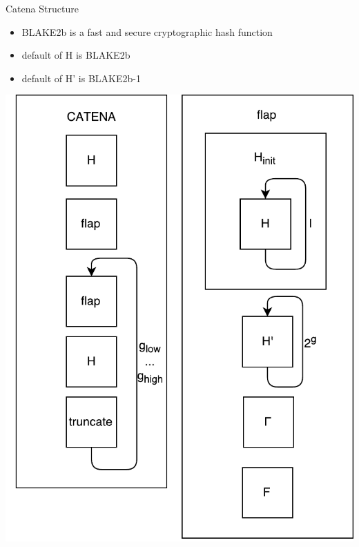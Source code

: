 \documentclass[11pt,aspectratio=169]{beamer}
\begin{document}
\begin{frame}{Catena Structure}
  \begin{minipage}[H]{0.55\linewidth}
    \begin{itemize}
      \item BLAKE2b is a fast and secure cryptographic hash function
      \item default of H is BLAKE2b
      \item default of H' is BLAKE2b-1
    \end{itemize}
  \end{minipage}
  \hfill
  \begin{minipage}[H]{0.4\linewidth}
    \includegraphics[height=0.85\textheight]{./images/overview.pdf}
  \end{minipage}
\end{frame}
\end{document}
